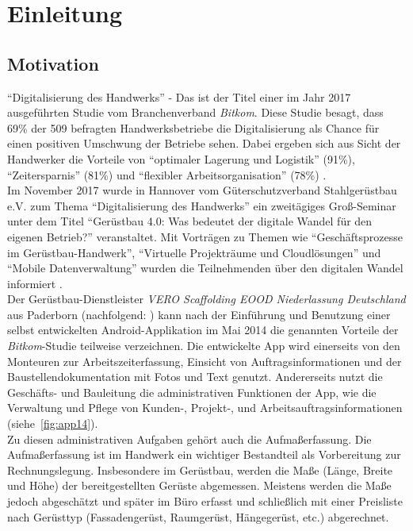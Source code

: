 \chapter{Einleitung}
\section{Motivation}\label{subsec:motivation}
``Digitalisierung des Handwerks'' - Das ist der Titel einer im Jahr 2017 ausgeführten Studie vom Branchenverband \textit{Bitkom}. 
Diese Studie besagt, dass 69\% der 509 befragten Handwerksbetriebe die Digitalisierung als Chance für einen positiven Umschwung der Betriebe sehen. 
Dabei ergeben sich aus Sicht der Handwerker die Vorteile von ``optimaler Lagerung und Logistik'' (91\%), ``Zeitersparnis'' (81\%) und ``flexibler Arbeitsorganisation'' (78\%) \citep{Bitkom17}. \\

Im November 2017 wurde in Hannover vom Güterschutzverband Stahlgerüstbau e.V. zum Thema ``Digitalisierung des Handwerks'' ein zweitägiges Groß-Seminar unter dem Titel ``Gerüstbau 4.0: Was bedeutet der digitale Wandel für den eigenen Betrieb?'' veranstaltet. 
Mit Vorträgen zu Themen wie ``Geschäftsprozesse im Gerüstbau-Handwerk'', ``Virtuelle Projekträume und Cloudlösungen'' und ``Mobile Datenverwaltung'' wurden die Teilnehmenden über den digitalen Wandel informiert \citep{GSV17}. \\

Der Gerüstbau-Dienstleister \emph{VERO Scaffolding EOOD Niederlassung Deutschland} aus Paderborn (nachfolgend: \vr{}) kann nach der Einführung und Benutzung einer selbst entwickelten Android-Applikation im Mai 2014 die genannten Vorteile der \textit{Bitkom}-Studie teilweise verzeichnen.
Die entwickelte App wird einerseits von den Monteuren zur Arbeitszeiterfassung, Einsicht von Auftragsinformationen und der Baustellendokumentation mit Fotos und Text genutzt.
Andererseits nutzt die Geschäfts- und Bauleitung die administrativen Funktionen der App, wie die Verwaltung und Pflege von Kunden-, Projekt-, und Arbeitsauftragsinformationen (siehe~\autoref{fig:app14}). \\

Zu diesen administrativen Aufgaben gehört auch die Aufmaßerfassung.
Die Aufmaßerfassung ist im Handwerk ein wichtiger Bestandteil als Vorbereitung zur Rechnungslegung.
Insbesondere im Gerüstbau, werden die Maße (Länge, Breite und Höhe) der bereitgestellten Gerüste abgemessen.
Meistens werden die Maße jedoch abgeschätzt und später im Büro erfasst und schließlich mit einer Preisliste nach Gerüsttyp (Fassadengerüst, Raumgerüst, Hängegerüst, etc.) abgerechnet.

